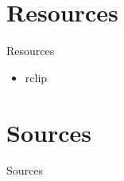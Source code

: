 \documentclass[xcolor=dvipsnames]{beamer}
\begin{document}
\section{Resources} %
\begin{frame}{Resources}
  \begin{itemize}
    \item rclip
  \end{itemize}
\end{frame}

\section{Sources} %
\begin{frame}[allowframebreaks]{Sources}
  \printbibliography[heading=bibnumbered, title = Bibliography]
\end{frame}
\end{document}
